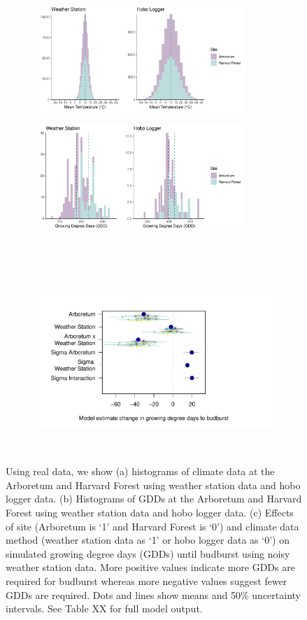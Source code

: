 \documentclass{article}\usepackage[]{graphicx}\usepackage[]{color}
\begin{document}
\begin{figure}
  \begin{subfigure}{.5\linewidth}
    \caption{}
    \centering
    \includegraphics[height=4cm, width=8cm]{..//analyses/figures/clim_methods_real.pdf}
    \label{fig:climreal}
  \end{subfigure}%
    \begin{subfigure}{.5\linewidth}
      \caption{}
      \centering
      \includegraphics[height=4cm, width=8cm]{..//analyses/figures/gdd_methods_real.pdf}
    \label{fig:gddreal}
  \end{subfigure}\\[1ex]
  \begin{subfigure}{\linewidth}
	    \caption{}
      \centering
      \includegraphics[height=7cm, width=11cm]{..//analyses/figures/muplot_urban_real.pdf}
      \label{fig:muplotreal}
  \end{subfigure}
\caption{ Using real data, we show (a) histograms of climate data at the Arboretum and Harvard Forest using weather station data and hobo logger data. (b) Histograms of GDDs at the Arboretum and Harvard Forest using weather station data and hobo logger data. (c) Effects of site (Arboretum is `1' and Harvard Forest is `0') and climate data method (weather station data as `1' or hobo logger data as `0') on simulated growing degree days (GDDs) until budburst using noisy weather station data. More positive values indicate more GDDs are required for budburst whereas more negative values suggest fewer GDDs are required. Dots and lines show means and 50\% uncertainty intervals. See Table XX for full model output.}

\end{figure}
\end{document}
